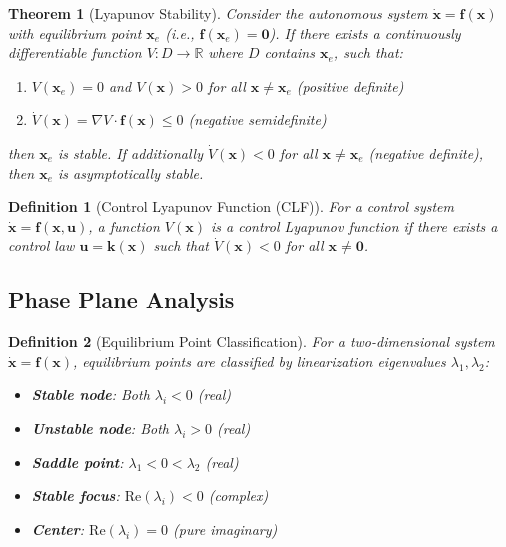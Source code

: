 \documentclass[a4paper, 11pt]{article}
\newtheorem{definition}{Definition}[section]
\newtheorem{theorem}{Theorem}[section]
\begin{document}
\begin{theorem}[Lyapunov Stability]
Consider the autonomous system $\dot{\mathbf{x}} = \mathbf{f}(\mathbf{x})$ with equilibrium point
$\mathbf{x}_e$ (i.e., $\mathbf{f}(\mathbf{x}_e) = \mathbf{0}$). If there exists a continuously differentiable
function $V: D \rightarrow \mathbb{R}$ where $D$ contains $\mathbf{x}_e$, such that:
\begin{enumerate}
\item $V(\mathbf{x}_e) = 0$ and $V(\mathbf{x}) > 0$ for all $\mathbf{x} \neq \mathbf{x}_e$ (positive definite)
\item $\dot{V}(\mathbf{x}) = \nabla V \cdot \mathbf{f}(\mathbf{x}) \leq 0$ (negative semidefinite)
\end{enumerate}
then $\mathbf{x}_e$ is stable. If additionally $\dot{V}(\mathbf{x}) < 0$ for all $\mathbf{x} \neq \mathbf{x}_e$
(negative definite), then $\mathbf{x}_e$ is asymptotically stable.
\end{theorem}

\begin{definition}[Control Lyapunov Function (CLF)]
For a control system $\dot{\mathbf{x}} = \mathbf{f}(\mathbf{x}, \mathbf{u})$, a function $V(\mathbf{x})$ is
a control Lyapunov function if there exists a control law $\mathbf{u} = \mathbf{k}(\mathbf{x})$ such that
$\dot{V}(\mathbf{x}) < 0$ for all $\mathbf{x} \neq \mathbf{0}$.
\end{definition}

\subsection{Phase Plane Analysis}

\begin{definition}[Equilibrium Point Classification]
For a two-dimensional system $\dot{\mathbf{x}} = \mathbf{f}(\mathbf{x})$, equilibrium points are
classified by linearization eigenvalues $\lambda_1, \lambda_2$:
\begin{itemize}
\item \textbf{Stable node}: Both $\lambda_i < 0$ (real)
\item \textbf{Unstable node}: Both $\lambda_i > 0$ (real)
\item \textbf{Saddle point}: $\lambda_1 < 0 < \lambda_2$ (real)
\item \textbf{Stable focus}: $\text{Re}(\lambda_i) < 0$ (complex)
\item \textbf{Center}: $\text{Re}(\lambda_i) = 0$ (pure imaginary)
\end{itemize}
\end{definition}
\end{document}
